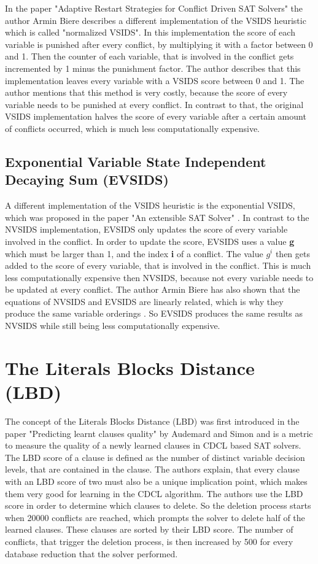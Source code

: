 In the paper "Adaptive Restart Strategies for Conflict Driven SAT Solvers" \cite{biere2008adaptive} the author Armin Biere describes a different implementation of the VSIDS heuristic which is called "normalized VSIDS". In this implementation the score of each variable is punished after every conflict, by multiplying it with a factor between 0 and 1. Then the counter of each variable, that is involved in the conflict gets incremented by 1 minus the punishment factor. The author describes that this implementation leaves every variable with a VSIDS score between 0 and 1. The author mentions that this method is very costly, because the score of every variable needs to be punished at every conflict. In contrast to that, the original VSIDS implementation halves the score of every variable after a certain amount of conflicts occurred, which is much less computationally expensive.

\subsection{Exponential Variable State Independent Decaying Sum (EVSIDS)}

A different implementation of the VSIDS heuristic is the exponential VSIDS, which was proposed in the paper "An extensible SAT Solver" \cite{een2003extensible}. In contrast to the NVSIDS implementation, EVSIDS only updates the score of every variable involved in the conflict. In order to update the score, EVSIDS uses a value \textbf{g} which must be larger than 1, and the index \textbf{i} of a conflict. The value $g^{i}$ then gets added to the score of every variable, that is involved in the conflict. This is much less computationally expensive then NVSIDS, because not every variable needs to be updated at every conflict. The author Armin Biere has also shown that the equations of NVSIDS and EVSIDS are linearly related, which is why they produce the same variable orderings \cite{biere2008adaptive}. So EVSIDS produces the same results as NVSIDS while still being less computationally expensive.

\section{The Literals Blocks Distance (LBD)}

The concept of the Literals Blocks Distance (LBD) was first introduced in the paper "Predicting learnt clauses quality" \cite{audemard2009predicting} by Audemard and Simon and is a metric to measure the quality of a newly learned clauses in CDCL based SAT solvers. The LBD score of a clause is defined as the number of distinct variable decision levels, that are contained in the clause. The authors explain, that every clause with an LBD score of two must also be a unique implication point, which makes them very good for learning in the CDCL algorithm. The authors use the LBD score in order to determine which clauses to delete. So the deletion process starts when 20000 conflicts are reached, which prompts the solver to delete half of the learned clauses. These clauses are sorted by their LBD score. The number of conflicts, that trigger the deletion process, is then increased by 500 for every database reduction that the solver performed.

